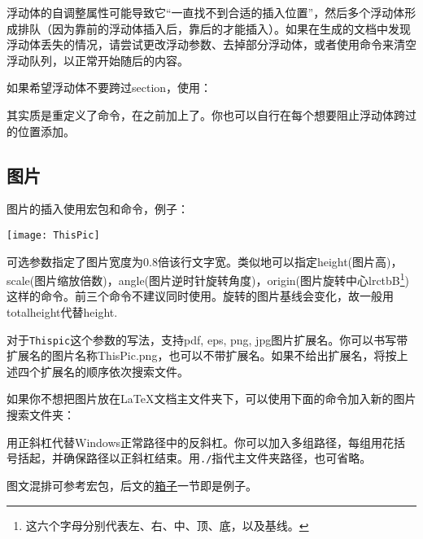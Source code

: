 浮动体的自调整属性可能导致它“一直找不到合适的插入位置”，然后多个浮动体形成排队（因为靠前的浮动体插入后，靠后的才能插入）。如果在生成的文档中发现浮动体丢失的情况，请尝试更改浮动参数、去掉部分浮动体，或者使用命令来清空浮动队列，以正常开始随后的内容。

如果希望浮动体不要跨过section，使用：
\begin{latex}
\usepackage[section]{placeins}
\end{latex}

其实质是重定义了命令，在之前加上了。你也可以自行在每个想要阻止浮动体跨过的位置添加。

\subsection{图片}
图片的插入使用宏包和命令，例子：
\begin{latex}
\begin{center}
    \texttt{[image: ThisPic]}
\end{center}
\end{latex}

可选参数指定了图片宽度为0.8倍该行文字宽。类似地可以指定height(图片高)，scale(图片缩放倍数)，angle(图片逆时针旋转角度)，origin(图片旋转中心lrctbB\footnote{这六个字母分别代表左、右、中、顶、底，以及基线。})这样的命令。前三个命令不建议同时使用。旋转的图片基线会变化，故一般用totalheight代替height. 

对于\texttt{Thispic}这个参数的写法，\xelatex 支持pdf, eps, png, jpg图片扩展名。你可以书写带扩展名的图片名称ThisPic.png，也可以不带扩展名。如果不给出扩展名，将按上述四个扩展名的顺序依次搜索文件。\dpar

如果你不想把图片放在\LaTeX 文档主文件夹下，可以使用下面的命令加入新的图片搜索文件夹：
\begin{latex}
\graphicspath{{c:/pics/}{./pic/}}
\end{latex}

用正斜杠代替Windows正常路径中的反斜杠。你可以加入多组路径，每组用花括号括起，并确保路径以正斜杠结束。用\verb|./|指代主文件夹路径，也可省略。\dpar

图文混排可参考宏包，后文的\hyperref[sec:box]{箱子}一节即是例子。
\begin{latex}
\end{latex}

